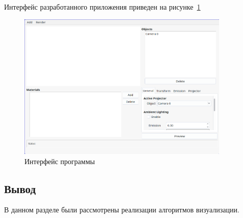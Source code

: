 Интерфейс разработанного приложения приведен на рисунке~\ref{fig:interface}

\begin{figure}[h]
    \centering
    \includegraphics[width=0.9\textwidth]{image/demo/main.png}
    \caption{Интерфейс программы}
    \label{fig:interface}
\end{figure}

\subsection*{Вывод}
В данном разделе были рассмотрены реализации алгоритмов визуализации.

\pagebreak

